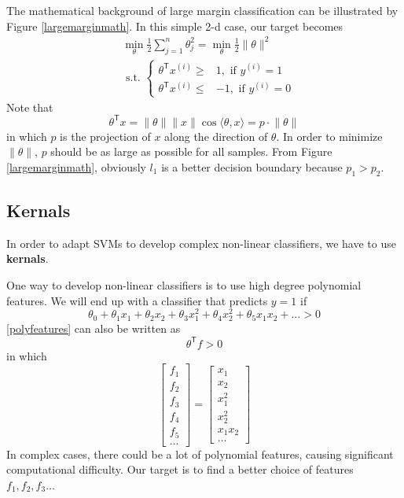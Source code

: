The mathematical background of large margin classification can be illustrated by Figure \ref{largemarginmath}. In this simple 2-d case, our target becomes
\begin{equation}
\begin{split}
&\min\limits_{\theta}\frac{1}{2}\sum\limits_{j=1}^{n}\theta_j^2=\min\limits_{\theta}\frac{1}{2}\lVert\theta\rVert^2\\
&\text{ s.t. }\left\{
\begin{aligned}
\theta^{\mathsf T}x^{(i)} \ge& 1, \text{ if }y^{(i)} = 1\\
\theta^{\mathsf T}x^{(i)} \le& -1, \text{ if }y^{(i)} = 0
\end{aligned}\right.
\end{split}
\end{equation}
Note that 
$$\theta^{\mathsf T}x= \lVert\theta\rVert\lVert x\rVert\cos\langle\theta,x\rangle = p\cdot \lVert\theta\rVert$$
in which $p$ is the projection of $x$ along the direction of $\theta$. In order to minimize $\lVert\theta\rVert$, $p$ should be as large as possible for all samples. From Figure \ref{largemarginmath}, obviously $l_1$ is a better decision boundary because $p_1>p_2$.
\subsection{Kernals}
In order to adapt SVMs to develop complex non-linear classifiers, we have to use {\bf kernals}.

One way to develop non-linear classifiers is to use high degree polynomial features. We will end up with a classifier that predicts $y=1$ if 
\begin{equation}\label{polyfeatures}
\theta_0 + \theta_1x_1 + \theta_2x_2 + \theta_3x_1^2 + \theta_4x_2^2 + \theta_5x_1x_2 + \dots > 0
\end{equation}
\eqref{polyfeatures} can also be written as 
$$\theta^{\mathsf T}f > 0$$
in which
\begin{equation*}
\begin{bmatrix}
f_1\\
f_2\\
f_3\\
f_4\\
f_5\\
\dots
\end{bmatrix}=
\begin{bmatrix}
x_1\\
x_2\\
x_1^2\\
x_2^2\\
x_1x_2\\
\dots
\end{bmatrix}
\end{equation*}
In complex cases, there could be a lot of polynomial features, causing significant computational difficulty. Our target is to find a better choice of features $f_1, f_2, f_3\dots$

